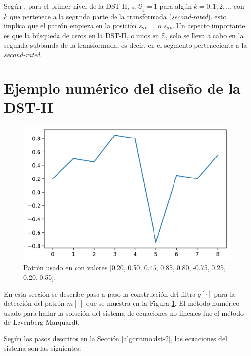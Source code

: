 Según \cite{Guido2018}, para el primer nivel de la DST-II, si $\mathbb{S}_{_k}=1$ para algún $k=0,1,2,\ldots$
con $k$ que pertenece a la segunda parte de la transformada (\textit{second-rated}), esto implica
que el patrón empieza en la posición $s_{2k-1}$ o $s_{2k}$. Un aspecto importante es que la búsqueda de 
ceros en la DST-II, o unos en $\mathbb{S}$, solo se lleva a cabo en la segunda subbanda de la transformada,
es decir, en el segmento perteneciente a la \textit{second-rated}.

\section{Ejemplo numérico del diseño de la DST-II}

\begin{figure} 
	\centering
	\includegraphics[scale=0.5]{Graphics/guido20118-pattern.png}
	\caption{Patrón usado en \cite{Guido2018} con valores [0.20, 0.50, 0.45, 0.85, 0.80, -0.75, 0.25, 0.20, 0.55].} \label{fig:Guido2018-pattern}
\end{figure}

En esta sección se describe paso a paso la construcción del filtro $q[\cdot]$ para la detección del
patrón $m[\cdot]$ que se muestra en la Figura \ref{fig:Guido2018-pattern}. El método numérico usado para hallar
la solución del sistema de ecuaciones no lineales fue el método de Levenberg-Marquardt.

Según los pasos descritos en la Sección \ref{algoritmo:dst-2}, las ecuaciones del sistema son las siguientes:

